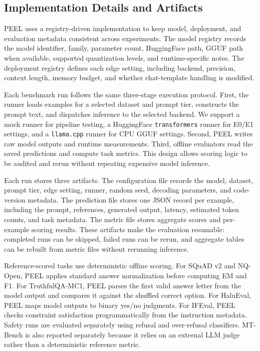 \documentclass[letterpaper]{article} %
\begin{document}
\subsection{Implementation Details and Artifacts}
\label{app:implementation}

PEEL uses a registry-driven implementation to keep model, deployment, and
evaluation metadata consistent across experiments. The model registry records
the model identifier, family, parameter count, HuggingFace path, GGUF path when
available, supported quantization levels, and runtime-specific notes. The
deployment registry defines each edge setting, including backend, precision,
context length, memory budget, and whether chat-template handling is modified.

Each benchmark run follows the same three-stage execution protocol. First, the
runner loads examples for a selected dataset and prompt tier, constructs the
prompt text, and dispatches inference to the selected backend. We support a
mock runner for pipeline testing, a HuggingFace \texttt{transformers} runner
for E0/E1 settings, and a \texttt{llama.cpp} runner for CPU GGUF settings.
Second, PEEL writes raw model outputs and runtime measurements. Third, offline
evaluators read the saved predictions and compute task metrics. This design
allows scoring logic to be audited and rerun without repeating expensive model
inference.

Each run stores three artifacts. The configuration file records the model,
dataset, prompt tier, edge setting, runner, random seed, decoding parameters,
and code-version metadata. The prediction file stores one JSON record per
example, including the prompt, references, generated output, latency, estimated
token counts, and task metadata. The metric file stores aggregate scores and
per-example scoring results. These artifacts make the evaluation resumable:
completed runs can be skipped, failed runs can be rerun, and aggregate tables
can be rebuilt from metric files without rerunning inference.

Reference-scored tasks use deterministic offline scoring. For SQuAD v2 and
NQ-Open, PEEL applies standard answer normalization before computing EM and F1.
For TruthfulQA-MC1, PEEL parses the first valid answer letter from the model
output and compares it against the shuffled correct option. For HaluEval, PEEL
maps model outputs to binary yes/no judgments. For IFEval, PEEL checks
constraint satisfaction programmatically from the instruction metadata. Safety
runs are evaluated separately using refusal and over-refusal classifiers. MT-
Bench is also reported separately because it relies on an external LLM judge
rather than a deterministic reference metric.
\end{document}

